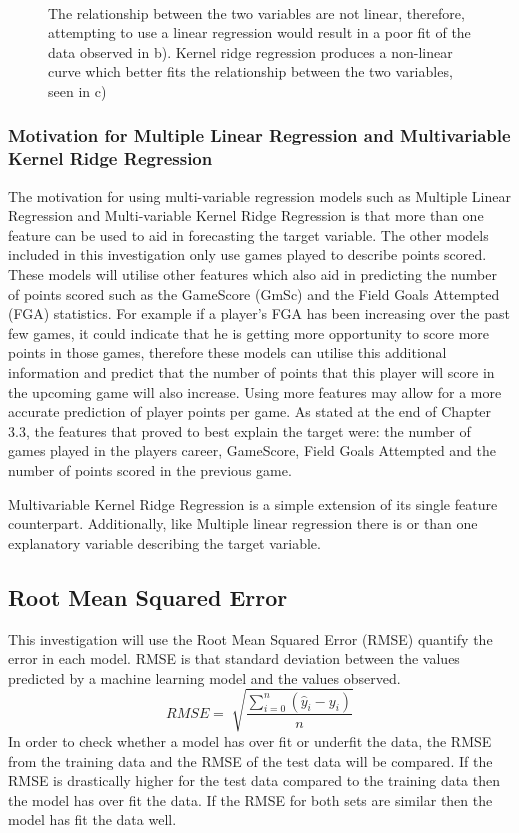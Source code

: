 \documentclass[a4paper,11pt,twoside]{article}
\begin{document}
\begin{figure} [h!]
{}\\
\caption{The relationship between the two variables are not linear, therefore, attempting to use a linear regression would result in a poor fit of the data observed in b). Kernel ridge regression produces a non-linear curve which better fits the relationship between the two variables, seen in c)}
\end{figure}

\subsubsection{Motivation for Multiple Linear Regression and Multivariable Kernel Ridge Regression}

The motivation for using multi-variable regression models such as Multiple Linear Regression and Multi-variable Kernel Ridge Regression is that more than one feature can be used to aid in forecasting the target variable. The other models included in this investigation only use games played to describe points scored. These models will utilise other features which also aid in predicting the number of points scored such as the GameScore (GmSc) and the Field Goals Attempted (FGA) statistics. For example if a player's FGA has been increasing over the past few games, it could indicate that he is getting more opportunity to score more points in those games, therefore these models can utilise this additional information and predict that the number of points that this player will score in the upcoming game will also increase. Using more features may allow for a more accurate prediction of player points per game. As stated at the end of Chapter 3.3, the features that proved to best explain the target were: the number of games played in the players career, GameScore, Field Goals Attempted and the number of points scored in the previous game.

Multivariable Kernel Ridge Regression is a simple extension of its single feature counterpart. Additionally, like Multiple linear regression there is or than one explanatory variable describing the target variable. 


\subsection{Root Mean Squared Error}
This investigation will use the Root Mean Squared Error (RMSE) quantify the error in each model. RMSE is that standard deviation between the values predicted by a machine learning model and the values observed.
\begin{equation}
RMSE = \sqrt[]{\frac{\sum_{i=0}^{n}(\hat{y}_{i} - y_{i})}{n}}
\end{equation}
In order to check whether a model has over fit or underfit the data, the RMSE from the training data and the RMSE of the test data will be compared. If the RMSE is drastically higher for the test data compared to the training data then the model has over fit the data. If the RMSE for both sets are similar then the model has fit the data well. 
\end{document}
